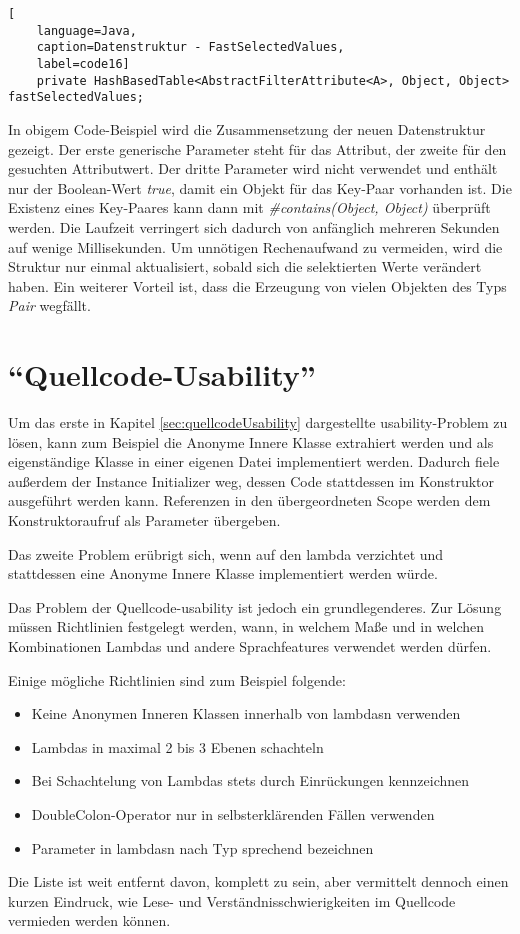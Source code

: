 \begin{lstlisting}[
    language=Java,
    caption=Datenstruktur - FastSelectedValues,
    label=code16]
	private HashBasedTable<AbstractFilterAttribute<A>, Object, Object> fastSelectedValues;
\end{lstlisting}

In obigem Code-Beispiel wird die Zusammensetzung der neuen Datenstruktur gezeigt. Der erste generische Parameter steht für das Attribut, der zweite für den gesuchten Attributwert. Der dritte Parameter wird nicht verwendet und enthält nur der Boolean-Wert \textit{true}, damit ein Objekt für das Key-Paar vorhanden ist. Die Existenz eines Key-Paares kann dann mit \textit{\#contains(Object, Object)} überprüft werden. Die Laufzeit verringert sich dadurch von anfänglich mehreren Sekunden auf wenige Millisekunden. Um unnötigen Rechenaufwand zu vermeiden, wird die Struktur nur einmal aktualisiert, sobald sich die selektierten Werte verändert haben. Ein weiterer Vorteil ist, dass die Erzeugung von vielen Objekten des Typs \textit{Pair} wegfällt.

\section{\enquote{Quellcode-Usability}} \label{sec:verbQuellcode}

Um das erste in Kapitel \ref{sec:quellcodeUsability} dargestellte \gls{usability}-Problem zu lösen, kann zum Beispiel die Anonyme Innere Klasse extrahiert werden und als eigenständige Klasse in einer eigenen Datei implementiert werden. Dadurch fiele außerdem der Instance Initializer weg, dessen Code stattdessen im Konstruktor ausgeführt werden kann. Referenzen in den übergeordneten Scope werden dem Konstruktoraufruf als Parameter übergeben.

Das zweite Problem erübrigt sich, wenn auf den \gls{lambda} verzichtet und stattdessen eine Anonyme Innere Klasse implementiert werden würde.

Das Problem der Quellcode-\gls{usability} ist jedoch ein grundlegenderes. Zur Lösung müssen Richtlinien festgelegt werden, wann, in welchem Maße und in welchen Kombinationen Lambdas und andere Sprachfeatures verwendet werden dürfen.

Einige mögliche Richtlinien sind zum Beispiel folgende:

\begin{itemize}
	\item Keine Anonymen Inneren Klassen innerhalb von \glspl{lambda}n verwenden
	\item Lambdas in maximal 2 bis 3 Ebenen schachteln
	\item Bei Schachtelung von Lambdas stets durch Einrückungen kennzeichnen
	\item DoubleColon-Operator nur in selbsterklärenden Fällen verwenden
	\item Parameter in \glspl{lambda}n nach Typ sprechend bezeichnen
\end{itemize}

Die Liste ist weit entfernt davon, komplett zu sein, aber vermittelt dennoch einen kurzen Eindruck, wie Lese- und Verständnisschwierigkeiten im Quellcode vermieden werden können.